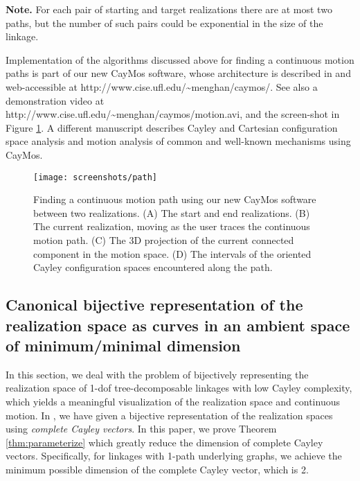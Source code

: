 \documentclass[secthm,amsthm,english]{article}
\theoremstyle{definition}
\theoremstyle{remark}
\begin{document}
\noindent\textbf{Note.} For each pair of starting and target realizations there are at most two paths, but the number of such pairs could be exponential in the size of the linkage. 



\bigskip
\noindent 
Implementation of the algorithms  discussed above 
for finding a continuous motion paths is part of our new CayMos software,
whose architecture is described in \cite{bib:caymos} and 
web-accessible at http://www.cise.ufl.edu/\~{}menghan/caymos/. 
See also a demonstration video 
at \\http://www.cise.ufl.edu/\~{}menghan/caymos/motion.avi, and the screen-shot in Figure \ref{F:caymos_path}. 
A different manuscript \cite{bib:beest} describes Cayley and Cartesian configuration space analysis and motion analysis 
of common and well-known mechanisms using CayMos.




\begin{figure}[hbtp]
\begin{center}
	\texttt{[image: screenshots/path]}
\end{center}

\caption{Finding a continuous motion path using our new CayMos software \protect\cite{bib:caymos} between two realizations. 
(A) The start and end realizations.
(B) The current realization, moving as the user traces the continuous motion path. 
(C) The 3D projection of the current connected component in the motion space. 
(D) The intervals of the oriented Cayley configuration spaces encountered along the path. }
\label{F:caymos_path}
\end{figure}

\subsection{Canonical bijective representation of the realization space as curves in an ambient space of minimum/minimal dimension}
\label{sec:ambient}

In this section, we deal with the problem of bijectively representing 
the realization space of 1-dof tree-decomposable linkages with low Cayley complexity,
which yields a meaningful visualization of the realization space and continuous motion.
In \cite{bib:beest}, we have given a bijective representation 
of the realization spaces using \emph{complete Cayley vectors}.
In this paper, we prove  Theorem \ref{thm:parameterize}
which greatly reduce the dimension of complete Cayley vectors. 
Specifically, for linkages with 1-path underlying graphs, 
we achieve the minimum possible dimension of the complete Cayley vector, which is 2.
\end{document}
